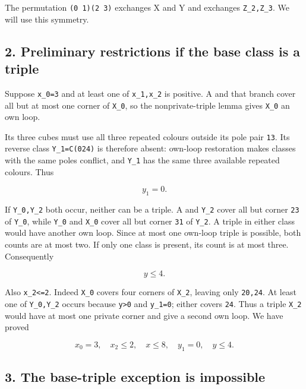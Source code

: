 \documentclass[
  10pt,
]{article}
\begin{document}
The permutation \texttt{(0\ 1)(2\ 3)} exchanges X and Y and exchanges
\texttt{Z\_2,Z\_3}. We will use this symmetry.

\hypertarget{preliminary-restrictions-if-the-base-class-is-a-triple}{%
\subsection*{2. Preliminary restrictions if the base class is a
triple}\label{preliminary-restrictions-if-the-base-class-is-a-triple}}

Suppose \texttt{x\_0=3} and at least one of \texttt{x\_1,x\_2} is
positive. A and that branch cover all but at most one corner of
\texttt{X\_0}, so the nonprivate-triple lemma gives \texttt{X\_0} an own
loop.

Its three cubes must use all three repeated colours outside its pole
pair \texttt{13}. Its reverse class \texttt{Y\_1=C(024)} is therefore
absent: own-loop restoration makes classes with the same poles conflict,
and \texttt{Y\_1} has the same three available repeated colours. Thus

\[
y_1=0.
\]

If \texttt{Y\_0,Y\_2} both occur, neither can be a triple. A and
\texttt{Y\_2} cover all but corner \texttt{23} of \texttt{Y\_0}, while
\texttt{Y\_0} and \texttt{X\_0} cover all but corner \texttt{31} of
\texttt{Y\_2}. A triple in either class would have another own loop.
Since at most one own-loop triple is possible, both counts are at most
two. If only one class is present, its count is at most three.
Consequently

\[
y\le4.
\]

Also \texttt{x\_2\textless{}=2}. Indeed \texttt{X\_0} covers four
corners of \texttt{X\_2}, leaving only \texttt{20,24}. At least one of
\texttt{Y\_0,Y\_2} occurs because \texttt{y\textgreater{}0} and
\texttt{y\_1=0}; either covers \texttt{24}. Thus a triple \texttt{X\_2}
would have at most one private corner and give a second own loop. We
have proved

\[
x_0=3,\quad x_2\le2,\quad x\le8,\quad
 y_1=0,\quad y\le4.
\]

\hypertarget{the-base-triple-exception-is-impossible}{%
\subsection*{3. The base-triple exception is
impossible}\label{the-base-triple-exception-is-impossible}}
\end{document}
